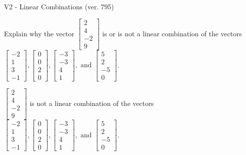 \begin{exercise}
  \begin{exerciseTitle}V2 - Linear Combinations (ver. 795)\end{exerciseTitle}
  \begin{exerciseStatement}
    Explain why the vector \(\left[\begin{array}{c}
2 \\
4 \\
-2 \\
9
\end{array}\right]\)  is or is not a linear 
	combination of the vectors \(\left[\begin{array}{c}
-2 \\
1 \\
3 \\
-1
\end{array}\right] , \left[\begin{array}{c}
0 \\
0 \\
2 \\
0
\end{array}\right] , \left[\begin{array}{c}
-3 \\
-3 \\
4 \\
1
\end{array}\right] , \text{ and } \left[\begin{array}{c}
5 \\
2 \\
-5 \\
0
\end{array}\right]\).
	


  \end{exerciseStatement}
  \begin{exerciseAnswer}
   \(\left[\begin{array}{c}
2 \\
4 \\
-2 \\
9
\end{array}\right]\) 
  	 is not  
	a linear combination of the vectors \(\left[\begin{array}{c}
-2 \\
1 \\
3 \\
-1
\end{array}\right] , \left[\begin{array}{c}
0 \\
0 \\
2 \\
0
\end{array}\right] , \left[\begin{array}{c}
-3 \\
-3 \\
4 \\
1
\end{array}\right] , \text{ and } \left[\begin{array}{c}
5 \\
2 \\
-5 \\
0
\end{array}\right]\).


\end{exerciseAnswer}
\end{exercise}
